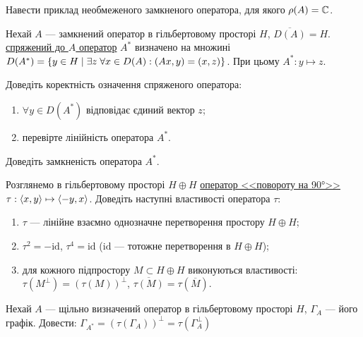 \begin{exercise}
    Навести приклад необмеженого замкненого оператора, для якого $\rho(A) = \mathbb{C}$.
\end{exercise}

\begin{theory}
    Нехай $A$ --- замкнений оператор в гільбертовому просторі $H$, $\overline{D(A)} = H$.
    \ul{спряжений до $A$ оператор} $A^*$ визначено на множині $D(A^*) = \{
        y \in H \mid \exists z \; \forall x \in D(A): \left(Ax, y\right) = \left(x, z\right)
    \}$.
    При цьому $A^*: y \mapsto z$.
\end{theory}

\begin{exercise}
    Доведіть коректність означення спряженого оператора:
    \begin{enumerate}
        \item $\forall y \in D(A^*)$ відповідає єдиний вектор $z$;
        \item перевірте лінійність оператора $A^*$.
    \end{enumerate}
\end{exercise}

\begin{exercise}
    Доведіть замкненість оператора $A^*$.
\end{exercise}

\begin{exercise}
    Розглянемо в гільбертовому просторі $H \oplus H$ \uline{оператор <<повороту на 90°>>}
    $\tau: \left\langle x, y\right\rangle \mapsto \left\langle-y, x\right\rangle$.
    Доведіть наступні властивості оператора $\tau$:
    \begin{enumerate}
        \item $\tau$ --- лінійне взаємно однозначне перетворення простору $H \oplus H$;
        \item $\tau^2 = -\mathrm{id}$, $\tau^4 = \mathrm{id}$ 
              ($\mathrm{id}$ --- тотожне перетворення в $H \oplus H$);
        \item для кожного підпростору $M \subset H \oplus H$ виконуються властивості:
              $\tau(M^\perp) = (\tau(M))^\perp$, $\overline{\tau(M)} = \tau(\overline{M})$.
    \end{enumerate}
\end{exercise}

\begin{exercise}
    Нехай $A$ --- щільно визначений оператор в гільбертовому просторі $H$,
    $\Gamma_A$ --- його графік. Довести: 
    $\Gamma_{A^*} = (\tau(\Gamma_A))^\perp = \tau(\Gamma_A^\perp)$
\end{exercise}

